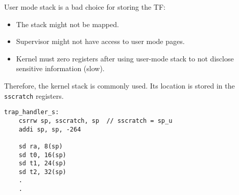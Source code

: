 User mode stack is a bad choice for storing the TF:
\begin{itemize}
    \item The stack might not be mapped.
    \item Supervisor might not have access to user mode pages.
    \item Kernel must zero registers after using user-mode stack to not disclose sensitive information (slow).
\end{itemize}
Therefore, the kernel stack is commonly used. Its location is stored in the \texttt{sscratch} registers.

\newpar{}

\begin{lstlisting}[language={[RISC-V]Assembler}]
trap_handler_s:
	csrrw sp, sscratch, sp  // sscratch = sp_u  
    addi sp, sp, -264
    
	sd ra, 8(sp)
	sd t0, 16(sp)
	sd t1, 24(sp)
	sd t2, 32(sp)
    .
    .
\end{lstlisting}